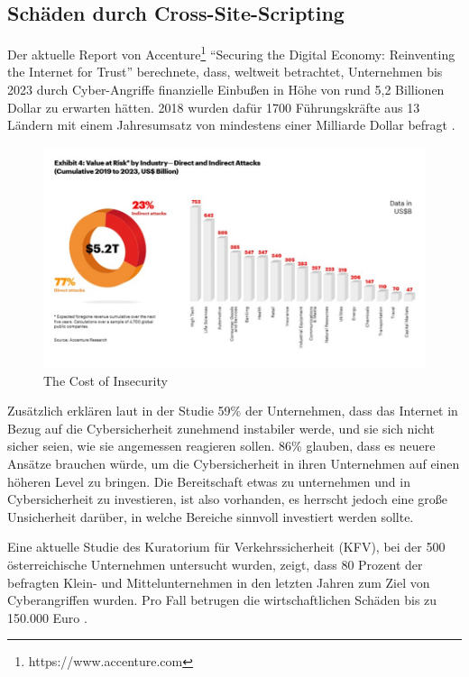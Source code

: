 \subsection{Schäden durch Cross-Site-Scripting}
\label{subsection:damage_from_xss}

Der aktuelle Report von Accenture\footnote{https://www.accenture.com} ``Securing the Digital Economy: Reinventing the Internet for Trust'' berechnete, dass, weltweit betrachtet, Unternehmen bis 2023 durch Cyber-Angriffe finanzielle Einbußen in Höhe von rund 5,2 Billionen Dollar zu erwarten hätten. 2018 wurden dafür 1700 Führungskräfte aus 13 Ländern mit einem Jahresumsatz von mindestens einer Milliarde Dollar befragt \autocite[16]{abbosh2019}.

\begin{figure}[ht]
	\centering
	\includegraphics[width=1\linewidth]{images/Accenture.png}
	\caption[The Cost of Insecurity]
	{The Cost of Insecurity \autocite[17]{abbosh2019}}
\end{figure}

Zusätzlich erklären laut \textcite[17]{abbosh2019} in der Studie 59\% der Unternehmen, dass das Internet in Bezug auf die Cybersicherheit zunehmend instabiler werde, und sie sich nicht sicher seien, wie sie angemessen reagieren sollen. 86\% glauben, dass es neuere Ansätze brauchen würde, um die Cybersicherheit in ihren Unternehmen auf einen höheren Level zu bringen.  Die Bereitschaft etwas zu unternehmen und in Cybersicherheit zu investieren, ist also vorhanden, es herrscht jedoch eine große Unsicherheit darüber, in welche Bereiche sinnvoll investiert werden sollte.

Eine aktuelle Studie des Kuratorium für Verkehrssicherheit (KFV), bei der 500 österreichische Unternehmen untersucht wurden, zeigt, dass 80 Prozent der befragten Klein- und Mittelunternehmen in den letzten Jahren zum Ziel von Cyberangriffen wurden. Pro Fall betrugen die wirtschaftlichen Schäden bis zu 150.000 Euro \autocite{kfv2019}.

